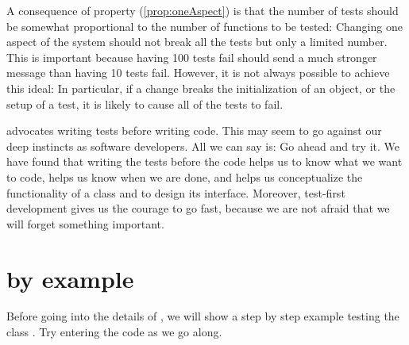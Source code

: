 \documentclass[a4paper,10pt,twoside]{book}
\begin{document}
A consequence of property (\ref{prop:oneAspect}) is that the number of tests should be somewhat proportional to the number of functions to be tested:
Changing one aspect of the system should not break all the tests but only a limited
number.
This is important because having 100 tests fail should send a much stronger message than having 10 tests fail.
However, it is not always possible to achieve this ideal:
In particular, if a change breaks the initialization of an object, or the setup of a test, it is likely to cause all of the tests to fail.

 advocates writing tests before writing code.
This may seem to go against our deep instincts as software developers.
All we can say is:
Go ahead and try it.
We have found that writing the tests before the code helps us to know what we want to code, helps us know when we are done, and helps us conceptualize the functionality of a class and to design its interface.
Moreover, test-first development gives us the courage to go fast, because we are not afraid that we will forget something important.




\section{\sunit by example}

Before going into the details of \SUnit, we will show a step by step example testing the class .
Try entering the code as we go along.
\end{document}

